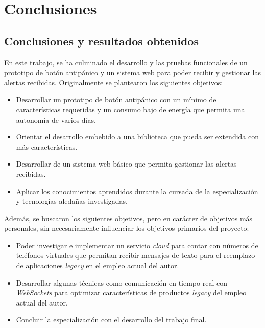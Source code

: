 
\chapter{Conclusiones} %

\label{Chapter5} %




\section{Conclusiones y resultados obtenidos}

En este trabajo, se ha culminado el desarrollo y las pruebas funcionales de un prototipo de botón antipánico y un sistema web para poder recibir y gestionar las alertas recibidas. Originalmente se plantearon los siguientes objetivos:
\begin{itemize}
	\item Desarrollar un prototipo de botón antipánico con un mínimo de características requeridas y un consumo bajo de energía que permita una autonomía de varios días.
	\item Orientar el desarrollo embebido a una biblioteca que pueda ser extendida con más características.
	\item Desarrollar de un sistema web básico que permita gestionar las alertas recibidas.
	\item Aplicar los conocimientos aprendidos durante la cursada de la especialización y tecnologías aledañas investigadas.
\end{itemize}

Además, se buscaron los siguientes objetivos, pero en carácter de objetivos más personales, sin necesariamente influenciar los objetivos primarios del proyecto:
\begin{itemize}
	\item Poder investigar e implementar un servicio \textit{cloud} para contar con números de teléfonos virtuales que permitan recibir mensajes de texto para el reemplazo de aplicaciones \textit{legacy} en el empleo actual del autor.
	\item Desarrollar algunas técnicas como comunicación en tiempo real con \textit{WebSockets} para optimizar características de productos \textit{legacy} del empleo actual del autor.
	\item Concluir la especialización con el desarrollo del trabajo final.
\end{itemize}

